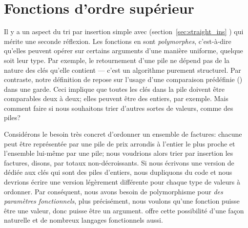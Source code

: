 \section{Fonctions d'ordre supérieur}


Il y a un aspect du tri par insertion simple avec 
(section~\ref{sec:straight_ins} ) qui
mérite une seconde réflexion. Les fonctions en \Erlang sont
\emph{polymorphes},
c'est-à-dire qu'elles peuvent opérer sur certains arguments d'une
manière uniforme, quelque soit leur type. Par exemple, le retournement
d'une pile ne dépend pas de la nature des clés qu'elle contient ---
c'est un algorithme purement structurel. Par contraste, notre
définition de  repose sur l'usage d'une comparaison
prédéfinie (\erlcode{>}) dans une garde. Ceci implique que toutes les
clés dans la pile doivent être comparables deux à deux; elles peuvent
être des entiers, par exemple. Mais comment faire si nous souhaitons
trier d'autres sortes de valeurs, comme des piles?

Considérons le besoin très concret d'ordonner un ensemble de factures:
chacune peut être représentée par une pile de prix arrondis à l'entier
le plus proche et l'ensemble lui-même par une pile; nous voudrions
alors trier par insertion les factures, disons, par totaux
non-décroissants. Si nous écrivons une version de 
dédiée aux clés qui sont des piles d'entiers, nous dupliquons du code
et nous devrions écrire une version légèrement différente pour chaque
type de valeurs à ordonner. Par conséquent, nous avons besoin de
polymorphisme pour \emph{des paramètres fonctionnels}, plus
précisément, nous voulons qu'une fonction puisse être une valeur, donc
puisse être un argument. \Erlang offre cette possibilité d'une façon
naturelle et de nombreux langages fonctionnels aussi.


